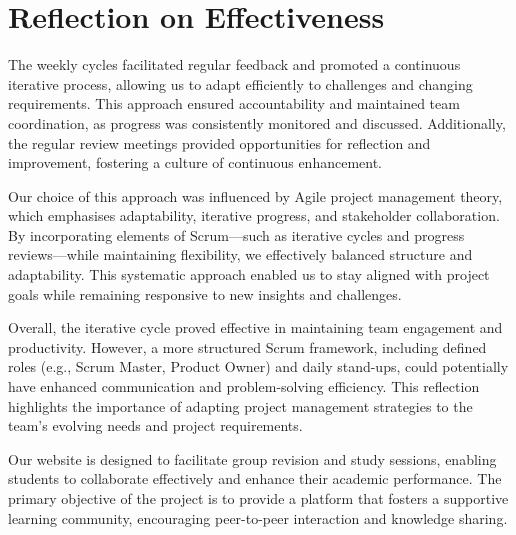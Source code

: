 \section{Reflection on Effectiveness}
\label{sect: Reflection on Effectiveness}
\begin{length}
    The weekly cycles facilitated regular feedback and promoted a continuous iterative process, allowing us to adapt efficiently to challenges and changing requirements. This approach ensured accountability and maintained team coordination, as progress was consistently monitored and discussed. Additionally, the regular review meetings provided opportunities for reflection and improvement, fostering a culture of continuous enhancement.

    Our choice of this approach was influenced by Agile project management theory, which emphasises adaptability, iterative progress, and stakeholder collaboration. By incorporating elements of Scrum—such as iterative cycles and progress reviews—while maintaining flexibility, we effectively balanced structure and adaptability. This systematic approach enabled us to stay aligned with project goals while remaining responsive to new insights and challenges.

    Overall, the iterative cycle proved effective in maintaining team engagement and productivity. However, a more structured Scrum framework, including defined roles (e.g., Scrum Master, Product Owner) and daily stand-ups, could potentially have enhanced communication and problem-solving efficiency. This reflection highlights the importance of adapting project management strategies to the team’s evolving needs and project requirements.

    Our website is designed to facilitate group revision and study sessions, enabling students to collaborate effectively and enhance their academic performance. The primary objective of the project is to provide a platform that fosters a supportive learning community, encouraging peer-to-peer interaction and knowledge sharing.
\end{length}